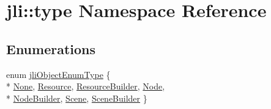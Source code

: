 \hypertarget{namespacejli_1_1type}{\section{jli\+:\+:type Namespace Reference}
\label{namespacejli_1_1type}
}
\subsection*{Enumerations}
\begin{DoxyCompactItemize}
\item 
enum \hyperlink{namespacejli_1_1type_a902d3ca40483b7825e5d9d0d81d6d69b}{jli\+Object\+Enum\+Type} \{ \\*
\hyperlink{namespacejli_1_1type_a902d3ca40483b7825e5d9d0d81d6d69bae6c48303b9c692c5173e55a981110620}{None}, 
\hyperlink{namespacejli_1_1type_a902d3ca40483b7825e5d9d0d81d6d69baeccf415a85af4bc021b58a1574546940}{Resource}, 
\hyperlink{namespacejli_1_1type_a902d3ca40483b7825e5d9d0d81d6d69baadc0c64c71ba08b308c338a803b6609d}{Resource\+Builder}, 
\hyperlink{namespacejli_1_1type_a902d3ca40483b7825e5d9d0d81d6d69ba735aa3ae541e9530e6323ab2ee587711}{Node}, 
\\*
\hyperlink{namespacejli_1_1type_a902d3ca40483b7825e5d9d0d81d6d69ba8e818e8f1a0ae33f40c50c993b566fec}{Node\+Builder}, 
\hyperlink{namespacejli_1_1type_a902d3ca40483b7825e5d9d0d81d6d69ba6bd816e7414c4f5cd1642695386c2768}{Scene}, 
\hyperlink{namespacejli_1_1type_a902d3ca40483b7825e5d9d0d81d6d69bacfb929a589abdf0990328cda488f57cc}{Scene\+Builder}
 \}
\end{DoxyCompactItemize}


